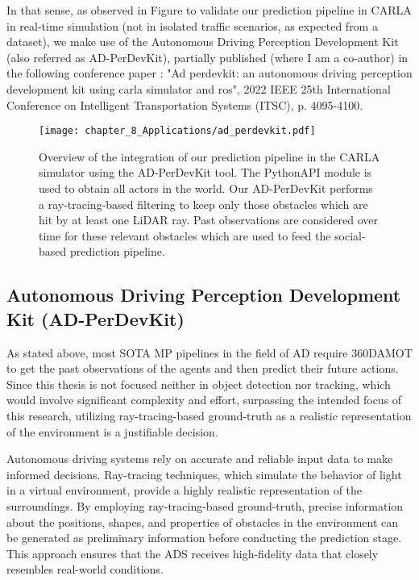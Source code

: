 In that sense, as observed in Figure to validate our prediction pipeline in \ac{CARLA} in real-time simulation (not in isolated traffic scenarios, as expected from a dataset), we make use of the Autonomous Driving Perception Development Kit (also referred as AD-PerDevKit), partially published (where I am a co-author) in the following conference paper \cite{de2022ad}: "Ad perdevkit: an autonomous driving perception development kit using carla simulator and ros", 2022 IEEE 25th International Conference on Intelligent Transportation Systems (ITSC), p. 4095-4100.  

\begin{figure}[h]
	\centering
	\texttt{[image: chapter\_8\_Applications/ad\_perdevkit.pdf]}
	\captionsetup{justification=justified}
	\caption[Overview of the integration of our prediction pipeline in the \ac{CARLA} simulator using the AD-PerDevKit tool]{Overview of the integration of our prediction pipeline in the \ac{CARLA} simulator using the AD-PerDevKit tool. The PythonAPI module is used to obtain all actors in the world. Our \ac{AD-PerDevKit} performs a ray-tracing-based filtering to keep only those obstacles which are hit by at least one \ac{LiDAR} ray. Past observations are considered over time for these relevant obstacles which are used to feed the social-based prediction pipeline.}
	\label{fig:chapter_8_Applications/ad_perdevkit}
\end{figure}

\subsection{Autonomous Driving Perception Development Kit (AD-PerDevKit)}
\label{subsec:8_ad_perdevkit}

As stated above, most \ac{SOTA} \ac{MP} pipelines in the field of \ac{AD} require 360\degree \ac{DAMOT} to get the past observations of the agents and then predict their future actions. Since this thesis is not focused neither in object detection nor tracking, which would involve significant complexity and effort, surpassing the intended focus of this research, utilizing ray-tracing-based ground-truth as a realistic representation of the environment is a justifiable decision.

Autonomous driving systems rely on accurate and reliable input data to make informed decisions. Ray-tracing techniques, which simulate the behavior of light in a virtual environment, provide a highly realistic representation of the surroundings. By employing ray-tracing-based ground-truth, precise information about the positions, shapes, and properties of obstacles in the environment can be generated as preliminary information before conducting the prediction stage. This approach ensures that the \ac{ADS} receives high-fidelity data that closely resembles real-world conditions. 

